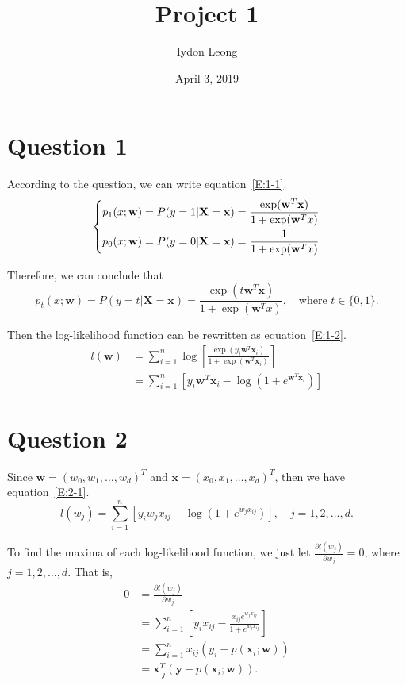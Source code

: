 \documentclass{article}
\title{Project 1}
\author{Iydon Leong}
\date{April 3, 2019}
\newcommand{\vecw}{\mathbf{w}}
\newcommand{\vecx}{\mathbf{x}}
\newcommand{\vecy}{\mathbf{y}}
\newcommand{\rvx}{\mathbf{X}}
\newcommand{\partialdd}[2]{\frac{\partial #1}{\partial #2}}
\begin{document}
\maketitle


\section{Question 1}\label{S:1}
According to the question, we can write equation~\eqref{E:1-1}.
\begin{equation}\label{E:1-1}
    \begin{dcases}
        p_1(x;\vecw) = P(y=1|\rvx=\vecx) = \frac{\exp(\vecw^T\vecx)}{1+\exp(\vecw^Tx)} \\
        p_0(x;\vecw) = P(y=0|\rvx=\vecx) = \frac{1}{1+\exp(\vecw^Tx)}
    \end{dcases}
\end{equation}

Therefore, we can conclude that
\begin{equation*}
    p_{t}(x;\vecw) = P(y=t|\rvx=\vecx) = \frac{\exp(t\vecw^T\vecx)}{1+\exp(\vecw^Tx)},\quad\text{where $t\in\{0,1\}$.}
\end{equation*}

Then the log-likelihood function can be rewritten as equation~\eqref{E:1-2}.
\begin{equation}\label{E:1-2}
    \begin{aligned}
        l(\vecw) &= \sum_{i=1}^n\log\left[\frac{\exp(y_i\vecw^T\vecx_i)}{1+\exp(\vecw^T\vecx_i)}\right] \\
                 &= \sum_{i=1}^n\left[y_i\vecw^T\vecx_i-\log\left(1+e^{\vecw^T\vecx_i}\right)\right]
    \end{aligned}
\end{equation}


\section{Question 2}\label{S:2}
Since $\vecw=(w_0,w_1,\ldots,w_d)^T$ and $\vecx=(x_0,x_1,\ldots,x_d)^T$, then we have equation~\eqref{E:2-1}.
\begin{equation}\label{E:2-1}
    l(w_j) = \sum_{i=1}^n\left[y_iw_jx_{ij}-\log\left(1+e^{w_jx_{ij}}\right)\right],\quad j=1,2,\ldots,d.
\end{equation}

To find the maxima of each log-likelihood function, we just let $\partialdd{l(w_j)}{w_j}=0$, where $j=1,2,\ldots,d$. That is,
\begin{equation}\label{E:2-2}
    \begin{aligned}
        0 &= \partialdd{l(w_j)}{w_j} \\
          &= \sum_{i=1}^n\left[y_ix_{ij}-\frac{x_{ij}e^{w_jx_{ij}}}{1+e^{w_jx_{ij}}}\right] \\
          &= \sum_{i=1}^nx_{ij}\left(y_i-p(\vecx_i;\vecw)\right) \\
          &= \vecx_{\cdot j}^T\left(\vecy-p(\vecx_i;\vecw)\right).
    \end{aligned}
\end{equation}
\end{document}
